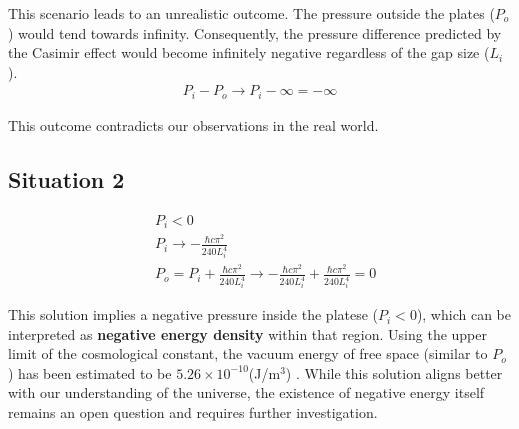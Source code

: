 This scenario leads to an unrealistic outcome. The pressure outside the plates ($P_o$) would tend towards infinity.
Consequently, the pressure difference predicted by the Casimir effect would become infinitely negative regardless of the gap size ($L_i$).
\begin{align}P_i - P_o \rightarrow P_i - \infty = - \infty\end{align}

This outcome contradicts our observations in the real world.

\subsection*{Situation 2}
\begin{align}
    &P_i < 0 \\
    &P_i \rightarrow -\frac{\hbar c \pi^2}{240 L_i^4} \\
    &P_o = P_i + \frac{\hbar c \pi^2}{240 L_i^4} \rightarrow -\frac{\hbar c \pi^2}{240 L_i^4} + \frac{\hbar c \pi^2}{240 L_i^4} = 0
\end{align}

This solution implies a negative pressure inside the platese ($P_i < 0$), 
which can be interpreted as \textbf{negative energy density} within that region.
Using the upper limit of the cosmological constant, 
the vacuum energy of free space (similar to $P_o$) has been estimated to be $5.26\times10^{-10}$(J/m$^3$)  \citep*{collaboration2020planck}.
While this solution aligns better with our understanding of the universe, 
the existence of negative energy itself remains an open question and requires further investigation.

